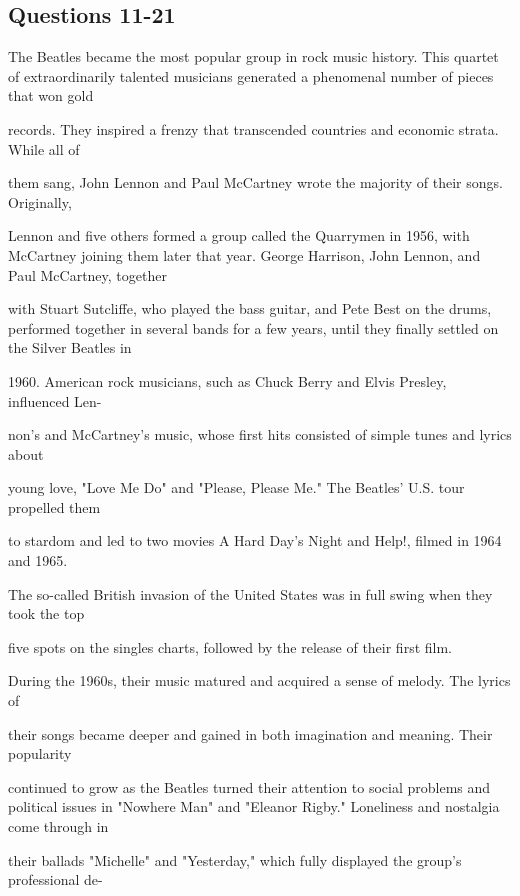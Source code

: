 \documentclass[12pt]{article}
\begin{document}
\subsection*{Questions 11-21}
\begingroup
\small
\sloppy
\setlength{\parskip}{0pt}
\setlength{\parindent}{0pt}
The Beatles became the most popular group in rock music history. This quartet of extraordinarily talented musicians generated a phenomenal number of pieces that won gold\par
records. They inspired a frenzy that transcended countries and economic strata. While all of\par
them sang, John Lennon and Paul McCartney wrote the majority of their songs. Originally,\par
Lennon and five others formed a group called the Quarrymen in 1956, with McCartney joining them later that year. George Harrison, John Lennon, and Paul McCartney, together\par
with Stuart Sutcliffe, who played the bass guitar, and Pete Best on the drums, performed together in several bands for a few years, until they finally settled on the Silver Beatles in\par
1960. American rock musicians, such as Chuck Berry and Elvis Presley, influenced Len-\par
non's and McCartney's music, whose first hits consisted of simple tunes and lyrics about\par
young love, "Love Me Do" and "Please, Please Me." The Beatles' U.S. tour propelled them\par
to stardom and led to two movies A Hard Day's Night and Help!, filmed in 1964 and 1965.\par
The so-called British invasion of the United States was in full swing when they took the top\par
five spots on the singles charts, followed by the release of their first film.\par
During the 1960s, their music matured and acquired a sense of melody. The lyrics of\par
their songs became deeper and gained in both imagination and meaning. Their popularity\par
continued to grow as the Beatles turned their attention to social problems and political issues in "Nowhere Man" and "Eleanor Rigby." Loneliness and nostalgia come through in\par
their ballads "Michelle" and "Yesterday," which fully displayed the group's professional de-\par
\end{document}
